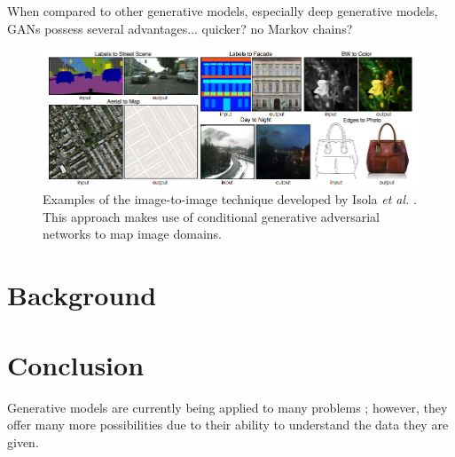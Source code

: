 \documentclass[11pt]{article}
\begin{document}
When compared to other generative models, especially deep generative models, GANs possess several advantages... quicker? no Markov chains?

\begin{figure}
\centering
\includegraphics[scale=0.65]{img2img}
\caption{Examples of the image-to-image technique developed by Isola \textit{et al.} \citep{2016arXiv161107004I}. This approach makes use of conditional generative adversarial networks to map image domains.}
\label{fig:Image to Image Examples}
\end{figure}

\section{Background}

\section{Conclusion}
Generative models are currently being applied to many problems \citep{genmodelingopenai}; however, they offer many more possibilities due to their ability to understand the data they are given.



\end{document}
